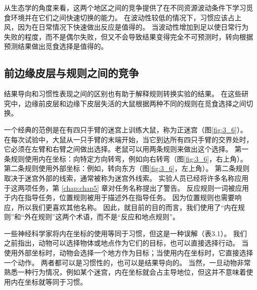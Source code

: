 从生态学的角度来看，这两个地区之间的竞争提供了在不同资源波动条件下学习觅食环境并在它们之间快速切换的能力。
在波动性较低的情况下，习惯应该占上风，因为在日常情况下快速做出反应是值得的。
当波动性增加到足以使日常行为失败的程度，而不是偶尔失败，但又不会导致结果变得完全不可预测时，转向根据预测结果做出觅食选择是值得的。\par



\subsection{前边缘皮层与规则之间的竞争}

结果导向和习惯性表现之间的区别也有助于解释规则转换实验的结果。
在这些研究中，边缘前皮层和边缘下皮层失活的大鼠根据两种不同的规则在觅食选择之间切换。\par


一个经典的范例是在有四只手臂的迷宫上训练大鼠，称为正迷宫（图\ref{fig:3_6}）。
在每次试验中，大鼠从一只手臂的末端开始，当它到达所有四只手臂的交界处时，它必须在左臂和右臂之间做出选择。老鼠可以用两条规则来做出这个选择。
第一条规则使用内在坐标：向特定方向转弯，例如向右转弯（图\ref{fig:3_6}，右上角）。
第二条规则使用外部坐标：例如，转向东方（图\ref{fig:3_6}，左上角）。
第二条规则取决于迷宫外部的线索，通常被称为迷宫外线索。
实验人员已经将许多名称应用于这两项任务，第 \ref{chap:chap5} 章对任务名称提出了警告。
反应规则一词被应用于内在指导任务，位置规则被用于描述外在指导任务。
因为位置规则也需要响应，所以我们更喜欢其他名称。
因此，就目前的目的而言，我们使用了“内在规则”和“外在规则”这两个术语，而不是“反应和地点规则”。\par


一些神经科学家将内在坐标的使用等同于习惯，但这是一种误解（表3.1）。
我们之前指出，动物可以选择物体或地点作为它们的目标，也可以直接选择行动。
当使用外部坐标时，动物会选择一个地方作为目标；当使用内在坐标时，它直接选择一个动作。
两者都可以是习惯性的，也可以是结果导向的。
当然，一旦动物非常熟悉一种行为情况，例如某个迷宫，内在坐标就会占主导地位，但这并不意味着使用内在坐标就等同于习惯。\par


